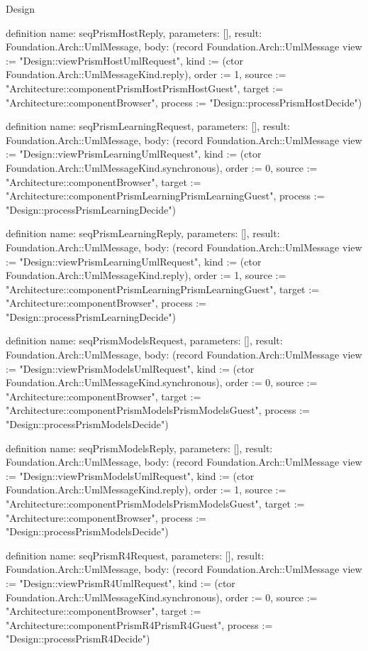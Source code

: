 \begin{lexlean}{Design}
\begin{semanticmodule}
definition{
  name: seqPrismHostReply,
  parameters: [],
  result: Foundation.Arch::UmlMessage,
  body: (record Foundation.Arch::UmlMessage {view := "Design::viewPrismHostUmlRequest", kind := (ctor Foundation.Arch::UmlMessageKind.reply), order := 1, source := "Architecture::componentPrismHostPrismHostGuest", target := "Architecture::componentBrowser", process := "Design::processPrismHostDecide"})
}

definition{
  name: seqPrismLearningRequest,
  parameters: [],
  result: Foundation.Arch::UmlMessage,
  body: (record Foundation.Arch::UmlMessage {view := "Design::viewPrismLearningUmlRequest", kind := (ctor Foundation.Arch::UmlMessageKind.synchronous), order := 0, source := "Architecture::componentBrowser", target := "Architecture::componentPrismLearningPrismLearningGuest", process := "Design::processPrismLearningDecide"})
}

definition{
  name: seqPrismLearningReply,
  parameters: [],
  result: Foundation.Arch::UmlMessage,
  body: (record Foundation.Arch::UmlMessage {view := "Design::viewPrismLearningUmlRequest", kind := (ctor Foundation.Arch::UmlMessageKind.reply), order := 1, source := "Architecture::componentPrismLearningPrismLearningGuest", target := "Architecture::componentBrowser", process := "Design::processPrismLearningDecide"})
}

definition{
  name: seqPrismModelsRequest,
  parameters: [],
  result: Foundation.Arch::UmlMessage,
  body: (record Foundation.Arch::UmlMessage {view := "Design::viewPrismModelsUmlRequest", kind := (ctor Foundation.Arch::UmlMessageKind.synchronous), order := 0, source := "Architecture::componentBrowser", target := "Architecture::componentPrismModelsPrismModelsGuest", process := "Design::processPrismModelsDecide"})
}

definition{
  name: seqPrismModelsReply,
  parameters: [],
  result: Foundation.Arch::UmlMessage,
  body: (record Foundation.Arch::UmlMessage {view := "Design::viewPrismModelsUmlRequest", kind := (ctor Foundation.Arch::UmlMessageKind.reply), order := 1, source := "Architecture::componentPrismModelsPrismModelsGuest", target := "Architecture::componentBrowser", process := "Design::processPrismModelsDecide"})
}

definition{
  name: seqPrismR4Request,
  parameters: [],
  result: Foundation.Arch::UmlMessage,
  body: (record Foundation.Arch::UmlMessage {view := "Design::viewPrismR4UmlRequest", kind := (ctor Foundation.Arch::UmlMessageKind.synchronous), order := 0, source := "Architecture::componentBrowser", target := "Architecture::componentPrismR4PrismR4Guest", process := "Design::processPrismR4Decide"})
}


\end{semanticmodule}
\end{lexlean}
